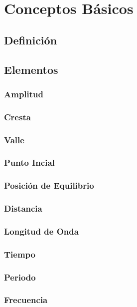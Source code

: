 \chapter{Conceptos Básicos}%
\section{Definición}%

\section{Elementos}

\subsection{Amplitud}

\subsection{Cresta}

\subsection{Valle}

\subsection{Punto Incial}

\subsection{Posición de Equilibrio}

\subsection{Distancia}

\subsection{Longitud de Onda}

\subsection{Tiempo}

\subsection{Periodo}

\subsection{Frecuencia}

